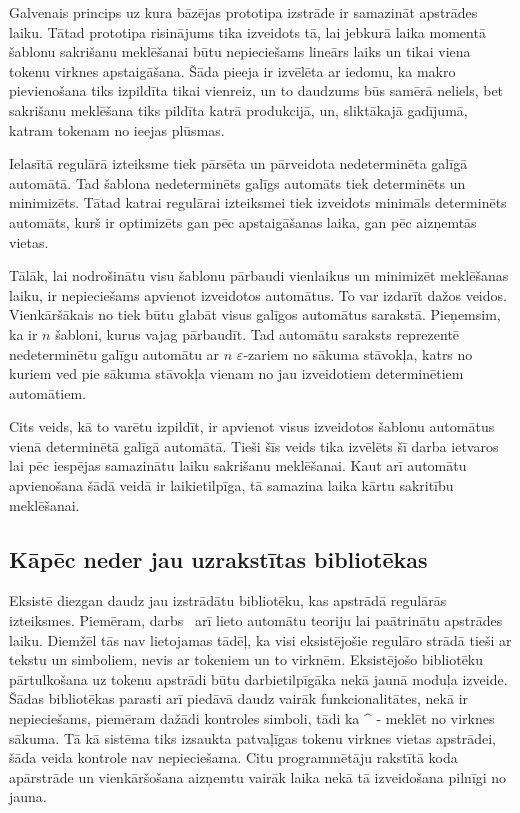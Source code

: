 Galvenais princips uz kura bāzējas prototipa izstrāde ir samazināt apstrādes laiku. Tātad prototipa risinājums tika izveidots tā, lai jebkurā laika momentā šablonu sakrišanu meklēšanai būtu nepieciešams lineārs laiks un tikai viena tokenu virknes apstaigāšana. Šāda pieeja ir izvēlēta ar iedomu, ka makro pievienošana tiks izpildīta tikai vienreiz, un to daudzums būs samērā neliels, bet sakrišanu meklēšana tiks pildīta katrā produkcijā, un, sliktākajā gadījumā, katram tokenam no ieejas plūsmas.

Ielasītā regulārā izteiksme tiek pārsēta un pārveidota nedeterminēta galīgā automātā. Tad šablona nedeterminēts galīgs automāts tiek determinēts un minimizēts. Tātad katrai regulārai izteiksmei tiek izveidots minimāls determinēts automāts, kurš ir optimizēts gan pēc apstaigāšanas laika, gan pēc aizņemtās vietas.

Tālāk, lai nodrošinātu visu šablonu pārbaudi vienlaikus un minimizēt meklēšanas laiku, ir nepieciešams apvienot izveidotos automātus. To var izdarīt dažos veidos. Vienkāršākais no tiek būtu glabāt visus galīgos automātus sarakstā. Pieņemsim, ka ir $n$ šabloni, kurus vajag pārbaudīt. Tad automātu saraksts reprezentē nedeterminētu galīgu automātu ar $n$ $\varepsilon$-zariem no sākuma stāvokļa, katrs no kuriem ved pie sākuma stāvokļa vienam no jau izveidotiem determinētiem automātiem.

Cits veids, kā to varētu izpildīt, ir apvienot visus izveidotos šablonu automātus vienā determinētā galīgā automātā. Tieši šīs veids tika izvēlēts šī darba ietvaros lai pēc iespējas samazinātu laiku sakrišanu meklēšanai. Kaut arī automātu apvienošana šādā veidā ir laikietilpīga, tā samazina laika kārtu sakritību meklēšanai.

\subsection{\label{sbs:sol_realizations}Kāpēc neder jau uzrakstītas bibliotēkas}

Eksistē diezgan daudz jau izstrādātu bibliotēku, kas apstrādā regulārās izteiksmes. Piemēram, darbs~\cite{RE2} arī lieto automātu teoriju lai paātrinātu apstrādes laiku. Diemžēl tās nav lietojamas tādēļ, ka visi eksistējošie regulāro strādā tieši ar tekstu un simboliem, nevis ar tokeniem un to virknēm. Eksistējošo bibliotēku pārtulkošana uz tokenu apstrādi būtu darbietilpīgāka nekā jaunā moduļa izveide. Šādas bibliotēkas parasti arī piedāvā daudz vairāk funkcionalitātes, nekā ir nepieciešams, piemēram dažādi kontroles simboli, tādi ka $\^$ - meklēt no virknes sākuma. Tā kā sistēma tiks izsaukta patvaļīgas tokenu virknes vietas apstrādei, šāda veida kontrole nav nepieciešama. Citu programmētāju rakstītā koda apārstrāde un vienkāršošana aizņemtu vairāk laika nekā tā izveidošana pilnīgi no jauna.

